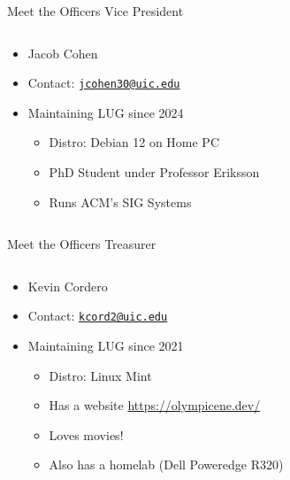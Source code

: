 \documentclass{beamer}
\begin{document}
\begin{frame}{Meet the Officers}
	{\Huge Vice President}
	\begin{columns}
		\begin{column}{0.5\textwidth}
			\begin{itemize}
				\item {\Large Jacob Cohen}
				\item Contact:
					\href{mailto:jcohen30@uic.edu}{\texttt{jcohen30@uic.edu}}
				\item Maintaining LUG since 2024
				\begin{itemize}
					\item Distro: Debian 12 on Home PC
					\item PhD Student under Professor Eriksson
					\item Runs ACM's SIG Systems
				\end{itemize}
			\end{itemize}
		\end{column}
		\begin{column}{0.5\textwidth}
			\begin{figure}
				\centering
			\end{figure}
		\end{column}
	\end{columns}
\end{frame}

\begin{frame}{Meet the Officers}
	{\Huge Treasurer}
	\begin{columns}
		\begin{column}{0.5\textwidth}
			\begin{itemize}
				\item {\Large Kevin Cordero}
				\item Contact:
					\href{mailto:kcord2@uic.edu}{\texttt{kcord2@uic.edu}}
				\item Maintaining LUG since 2021
				\begin{itemize}
					\item Distro: Linux Mint
					\item Has a website
						\url{https://olympicene.dev/}
					\item Loves movies!
					\item Also has a homelab (Dell
						Poweredge R320)
				\end{itemize}
			\end{itemize}
		\end{column}
	\end{columns}
\end{frame}
\end{document}

